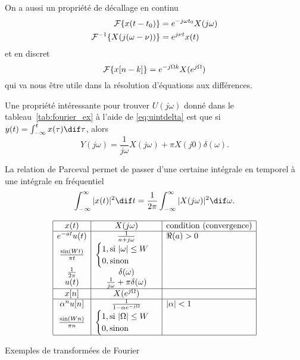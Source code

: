 On a aussi un propriété de décallage en continu
\begin{align*}
  \mathcal{F}\{x(t-t_0)\} & = e^{-j\omega t_0}X(j\omega)\\
  \mathcal{F}^{-1}\{X(j(\omega-\nu))\} & = e^{j\nu t}x(t)
\end{align*}
et en discret
\[ \mathcal{F}\{x[n-k]\} = e^{-j\Omega k} X(e^{j\Omega}) \]
qui va nous être utile dans la résolution d'équations aux différences.

Une propriété intéressante pour trouver $U(j\omega)$ donné dans le
tableau~\ref{tab:fourier_ex} à l'aide de \eqref{eq:uintdelta} est que si
$y(t) = \int_{-\infty}^t x(\tau) \dif \tau$, alors
\[ Y(j\omega) = \frac{1}{j\omega}X(j\omega) + \pi X(j0)\delta(\omega). \]

La relation de Parceval permet de passer d'une certaine intégrale en temporel
à une intégrale en fréquentiel
\[ \int_{-\infty}^\infty |x(t)|^2 \dif t
= \frac{1}{2\pi} \int_{-\infty}^\infty |X(j\omega)|^2 \dif \omega. \]

\begin{table}
  \[
    \begin{array}{|c|c|l|}
      \hline
      x(t) & X(j\omega) & \text{condition (convergence)}\\
      \hline
      e^{-at}u(t) & \frac{1}{a + j\omega} & \Re(a) > 0\\
      \frac{\sin(Wt)}{\pi t} &
      \begin{cases}
        1, \text{si } |\omega| \leq W\\
        0, \text{sinon}
      \end{cases}
      &\\
      \frac{1}{2\pi} & \delta(\omega) &\\
      u(t) & \frac{1}{j\omega} + \pi \delta(\omega)&\\
      \hline
      x[n] & X(e^{j\Omega}) &\\
      \hline
      \alpha^n u[n] & \frac{1}{1-\alpha e^{-j\Omega}} & |\alpha| < 1\\
      \frac{\sin(Wn)}{\pi n} &
      \begin{cases}
        1, \text{si } |\Omega| \leq W\\
        0, \text{sinon}
      \end{cases}
      &\\
      \hline
    \end{array}
  \]
  \caption{Exemples de transformées de Fourier}
  \label{tab:fourier_ex}
\end{table}

